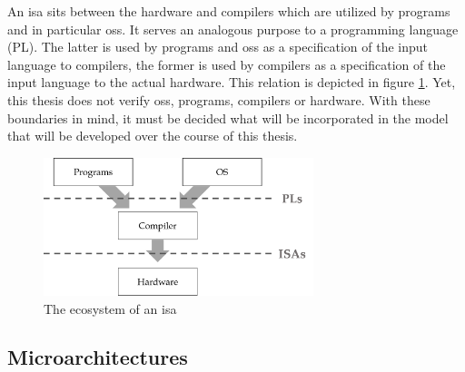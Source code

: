 An \gls{isa} sits between the hardware and compilers which are utilized by programs and in particular \glspl{os}.
It serves an analogous purpose to a programming language (PL).
The latter is used by programs and \glspl{os} as a specification of the input language to compilers, the former is used by compilers as a specification of the input language to the actual hardware.
This relation is depicted in figure \ref{fig:ecosystem}.
Yet, this thesis does not verify \glspl{os}, programs, compilers or hardware.
With these boundaries in mind, it must be decided what will be incorporated in the model that will be developed over the course of this thesis.

\begin{figure}
    \centering
    \includegraphics[width=0.7\textwidth]{figures/stack.png}
    \caption{The ecosystem of an \gls{isa}}
    \label{fig:ecosystem}
\end{figure}

\subsection{Microarchitectures}
\label{sec:microarchs}

